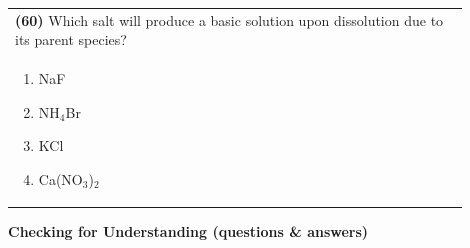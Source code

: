 \documentclass{article}
\begin{document}
\noindent\begin{tabular}{|p{0.9\linewidth}|}
\hline
\textbf{(60)} Which salt will produce a basic solution upon dissolution due to its parent species? \\[0.2cm]
\begin{minipage}{0.85\linewidth}
\begin{enumerate}[label=\alph*.]
\item NaF \item NH$_4$Br \item KCl \item Ca(NO$_3$)$_2$
\end{enumerate}
\end{minipage}\\[0.2cm]
\hline
\end{tabular}


\newpage
\noindent
{\large\textbf{Checking for Understanding (questions \& answers)}}\\
\end{document}
